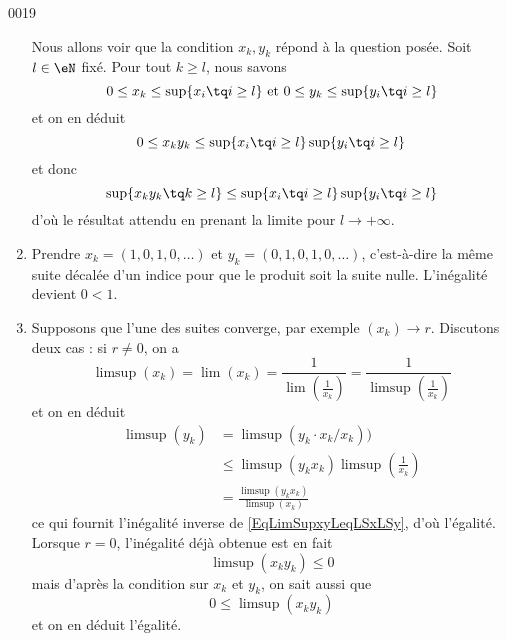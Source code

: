\begin{corrige}{0019}
\begin{enumerate}

Nous allons voir que la condition $x_k,y_k$ répond à la question posée. Soit $l \in \eN$ fixé. Pour tout $k \geq l$, nous savons
  \begin{equation*}
    0 \leq x_k \leq \sup\{ x_i \tq i \geq l\} \text{~et~} 0
    \leq y_k \leq \sup\{ y_i \tq i \geq l\}
  \end{equation*}
  et on en déduit%
  \begin{equation*}
    0 \leq x_k y_k \leq \sup\{ x_i \tq i \geq l\}  \sup\{ y_i \tq i \geq l\}
  \end{equation*}
  et donc
  \begin{equation*}
    \sup \{x_ky_k \tq k \geq l \} \leq \sup\{ x_i \tq i \geq l\}  \sup\{ y_i
    \tq i \geq l\}
  \end{equation*}
  d'où le résultat attendu en prenant la limite pour $l \rightarrow
  +\infty$.

\item Prendre $x_k = (1, 0, 1, 0, \ldots)$ et $y_k = (0, 1, 0, 1, 0,
  \ldots)$, c'est-à-dire la même suite décalée d'un indice pour que le
  produit soit la suite nulle. L'inégalité devient $0 < 1$.

\item 
Supposons que l'une des suites converge, par exemple $(x_k) \to r$. Discutons deux cas : si $r \neq 0$, on a
  \begin{equation}
    \limsup (x_k) = \lim (x_k) = \frac{1}{\lim(\frac{1}{x_k})} = \frac{1}{\limsup(\frac{1}{x_k})}
  \end{equation}
  et on en déduit
  \begin{equation}
    \begin{split}
      \limsup (y_k) &= \limsup(y_k \cdot x_k / x_k))\\
      &\leq \limsup(y_k x_k) \limsup \left(\frac1{x_k}\right)\\
      &= \frac{\limsup(y_k x_k)}{\limsup (x_k)}
    \end{split}
  \end{equation}
  ce qui fournit l'inégalité inverse de \eqref{EqLimSupxyLeqLSxLSy}, d'où l'égalité. Lorsque $r = 0$, l'inégalité déjà obtenue est en fait
  \begin{equation}
    \limsup (x_ky_k) \leq 0
  \end{equation}
  mais d'après la condition sur $x_k$ et $y_k$, on sait aussi que
  \begin{equation}
    0\leq\limsup (x_ky_k)
  \end{equation}
  et on en déduit l'égalité.
\end{enumerate}

\end{corrige}
